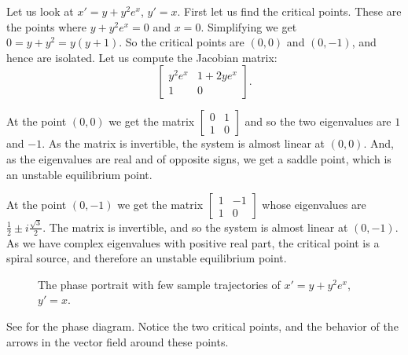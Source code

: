 \begin{example} \label{example:nlin-withexp}
Let us look at
$x'=y+y^2e^x$,
$y'=x$.  First let us find the critical points.  These are the points where
$y+y^2e^x = 0$ and $x=0$.  Simplifying we get $0=y+y^2 = y(y+1)$.  So the
critical points are $(0,0)$ and $(0,-1)$, and hence are isolated.  Let us
compute the Jacobian matrix:
\begin{equation*}
\begin{bmatrix}
y^2e^x & 1+2ye^x \\
1 & 0
\end{bmatrix}.
\end{equation*}

At the point $(0,0)$ we get the matrix
$\left[ \begin{smallmatrix} 0 & 1 \\ 1 & 0 \end{smallmatrix} \right]$ and
so the two eigenvalues are $1$ and $-1$.  As the matrix is invertible, the system is almost linear
at $(0,0)$.  And, as the eigenvalues are real
and of opposite signs, we get a saddle point, which is an unstable
equilibrium point.

At the point $(0,-1)$ we get the matrix
$\left[ \begin{smallmatrix} 1 & -1 \\ 1 & 0 \end{smallmatrix} \right]$ whose
eigenvalues are $\frac{1}{2} \pm i \frac{\sqrt{3}}{2}$.
The matrix is invertible, and so the system is almost linear at $(0,-1)$.
As we have complex eigenvalues with positive real part, the critical
point is a spiral source, and therefore an unstable equilibrium point.

\begin{figure}[h!t]
\capstart
\begin{center}
\caption{The phase portrait with few sample trajectories of 
$x'=y+y^2e^x$, $y'=x$.  \label{fig:nlin-ex813}}
\end{center}
\end{figure}

See  for the phase diagram.  Notice the two
critical points, and the behavior of the arrows in the vector field around
these points.
\end{example}

